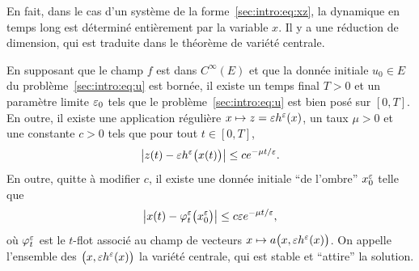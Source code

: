 En fait, dans le cas d'un système de la forme~\eqref{sec:intro:eq:xz}, la dynamique en temps long est déterminé entièrement par la variable $x$. Il y a une réduction de dimension, qui est traduite dans le théorème de variété centrale. 
\begin{FRtheorem*}
    En supposant que le champ $f$ est dans $C^\infty(E)$ et que la donnée initiale $u_0 \in E$ du problème~\eqref{sec:intro:eq:u} est bornée, il existe un temps final $T > 0$ et un paramètre limite $\varepsilon_0$ tels que le problème~\eqref{sec:intro:eq:u} est bien posé sur $[0,T]$. En outre, il existe une application régulière $x \mapsto z = \varepsilon h^{\varepsilon}(x)$, un taux $\mu > 0$ et une constante $c > 0$ tels que pour tout $t \in [0,T]$, 
    \begin{equation*}
        \left| z(t) - \varepsilon h^{\varepsilon}\big( x(t) \big) \right|
        \leq c e^{-\mu t/\varepsilon} .
    \end{equation*}
    En outre, quitte à modifier $c$, il existe une donnée initiale \enquote{de l'ombre} $x_0^{\varepsilon}$ telle que 
    \begin{equation*}
        \big| x(t) - \varphi_t^{\varepsilon} \big( x_0^{\varepsilon} \big) \big| 
        \leq c \varepsilon e^{-\mu t/\varepsilon} , 
    \end{equation*}
    où $\varphi^{\varepsilon}_t$ est le $t$-flot associé au champ de vecteurs $x \mapsto a\big(x, \varepsilon h^{\varepsilon}(x) \big)$. On appelle l'ensemble des $\big( x, \varepsilon h^{\varepsilon}(x) \big)$ la variété centrale, qui est stable et \enquote{attire} la solution. 
\end{FRtheorem*}

